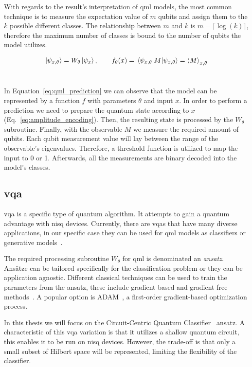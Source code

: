 With regards to the result's interpretation of \ac{qml} models, the most
common technique is to measure the expectation value of \(m\) qubits and
assign them to the \(k\) possible different classes. The relationship
between \(m\) and \(k\) is \(m = \lceil \log(k) \rceil\), therefore the
maximum number of classes is bound to the number of qubits the model
utilizes. \

\begin{equation}\label{eq:qml_prediction}
  \ket{\psi_{x,\theta}} = W_{\theta} \ket{\psi_{x}}, \qquad
  f_{\theta}(x) = \expval{M}{\psi_{x,\theta}} = \expval{M}_{x,\theta}
\end{equation} \

In Equation~\ref{eq:qml_prediction} we can observe that the
model can be represented by a function \(f\) with parameters \(\theta\)
and input \(x\). In order to perform a prediction we need to prepare
the quantum state according to \(x\) (Eq.~\ref{eq:amplitude_encoding}).
Then, the resulting state is processed by the \(W_{\theta}\) subroutine.
Finally, with the observable \(M\) we measure the required amount of
qubits. Each qubit measurement value will lay between the range of the
observable's eigenvalues. Therefore, a threshold function is utilized to
map the input to 0 or 1. Afterwards, all the measurements are binary
decoded into the model's classes. \

\subsection{\acl{vqa}}\label{subsection:vqa}

\ac{vqa} is a specific type of quantum algorithm. It attempts to
gain a quantum advantage with \ac{nisq} devices. Currently, there
are \ac{vqa}s that have many diverse applications, in our specific
case they can be used for \ac{qml} models as classifiers or
generative models~\cite{cerezo_variational_2021}.\

The required processing subroutine \(W_{\theta}\) for \ac{qml}
is denominated an \textit{ansatz}. Ansätze can be tailored specifically
for the classification problem or they can be application agnostic.
Different classical techniques can be used to train the parameters
from the ansatz, these include gradient-based and gradient-free
methods~\cite{benedetti_parameterized_2019}. A popular option is
ADAM~\cite{kingma_adam_2017}, a first-order gradient-based
optimization process. \

In this thesis we will focus on the Circuit-Centric Quantum
Classifier~\cite{schuld_circuit-centric_2020} ansatz. A
characteristic of this \ac{vqa} variation is that it utilizes
a shallow quantum circuit, this enables it to be run on \ac{nisq}
devices. However, the trade-off is that only a small
subset of Hilbert space will be represented, limiting the
flexibility of the classifier. \

